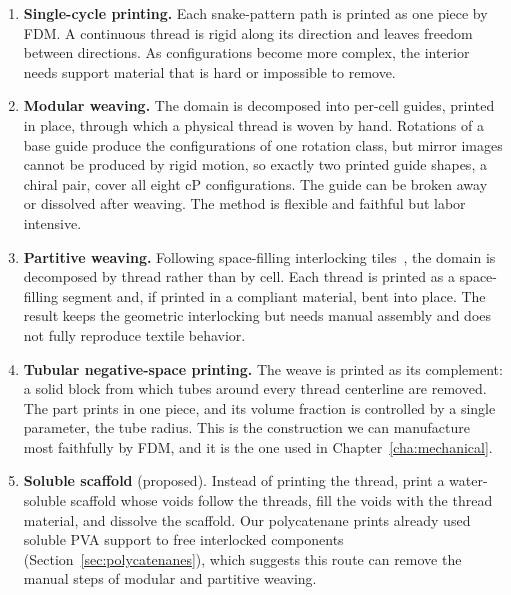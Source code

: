 \begin{enumerate}
\item \textbf{Single-cycle printing.} Each snake-pattern path is printed as one piece by FDM. A continuous thread is rigid along its direction and leaves freedom between directions. As configurations become more complex, the interior needs support material that is hard or impossible to remove.
\item \textbf{Modular weaving.} The domain is decomposed into per-cell guides, printed in place, through which a physical thread is woven by hand. Rotations of a base guide produce the configurations of one rotation class, but mirror images cannot be produced by rigid motion, so exactly two printed guide shapes, a chiral pair, cover all eight cP configurations. The guide can be broken away or dissolved after weaving. The method is flexible and faithful but labor intensive.
\item \textbf{Partitive weaving.} Following space-filling interlocking tiles~\cite{krishnamurthy2021geometrically,yildiz2023modular}, the domain is decomposed by thread rather than by cell. Each thread is printed as a space-filling segment and, if printed in a compliant material, bent into place. The result keeps the geometric interlocking but needs manual assembly and does not fully reproduce textile behavior.
\item \textbf{Tubular negative-space printing.} The weave is printed as its complement: a solid block from which tubes around every thread centerline are removed. The part prints in one piece, and its volume fraction is controlled by a single parameter, the tube radius. This is the construction we can manufacture most faithfully by FDM, and it is the one used in Chapter~\ref{cha:mechanical}.
\item \textbf{Soluble scaffold} (proposed). Instead of printing the thread, print a water-soluble scaffold whose voids follow the threads, fill the voids with the thread material, and dissolve the scaffold. Our polycatenane prints already used soluble PVA support to free interlocked components (Section~\ref{sec:polycatenanes}), which suggests this route can remove the manual steps of modular and partitive weaving.
\end{enumerate}

